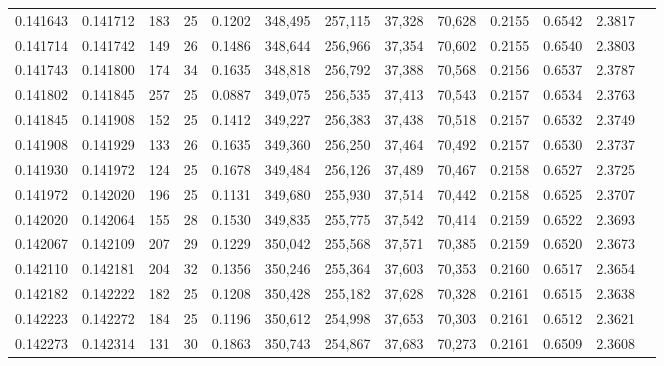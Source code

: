\begin{tabular}{rrrrrrrrrrrrr}
0.141643 & 0.141712 & 183 &  25 &                                     0.1202 & 348,495 & 257,115 &  37,328 &  70,628 & 0.2155 & 0.6542 & 2.3817 \\
0.141714 & 0.141742 & 149 &  26 &                                     0.1486 & 348,644 & 256,966 &  37,354 &  70,602 & 0.2155 & 0.6540 & 2.3803 \\
0.141743 & 0.141800 & 174 &  34 &                                     0.1635 & 348,818 & 256,792 &  37,388 &  70,568 & 0.2156 & 0.6537 & 2.3787 \\
0.141802 & 0.141845 & 257 &  25 &                                     0.0887 & 349,075 & 256,535 &  37,413 &  70,543 & 0.2157 & 0.6534 & 2.3763 \\
0.141845 & 0.141908 & 152 &  25 &                                     0.1412 & 349,227 & 256,383 &  37,438 &  70,518 & 0.2157 & 0.6532 & 2.3749 \\
0.141908 & 0.141929 & 133 &  26 &                                     0.1635 & 349,360 & 256,250 &  37,464 &  70,492 & 0.2157 & 0.6530 & 2.3737 \\
0.141930 & 0.141972 & 124 &  25 &                                     0.1678 & 349,484 & 256,126 &  37,489 &  70,467 & 0.2158 & 0.6527 & 2.3725 \\
0.141972 & 0.142020 & 196 &  25 &                                     0.1131 & 349,680 & 255,930 &  37,514 &  70,442 & 0.2158 & 0.6525 & 2.3707 \\
0.142020 & 0.142064 & 155 &  28 &                                     0.1530 & 349,835 & 255,775 &  37,542 &  70,414 & 0.2159 & 0.6522 & 2.3693 \\
0.142067 & 0.142109 & 207 &  29 &                                     0.1229 & 350,042 & 255,568 &  37,571 &  70,385 & 0.2159 & 0.6520 & 2.3673 \\
0.142110 & 0.142181 & 204 &  32 &                                     0.1356 & 350,246 & 255,364 &  37,603 &  70,353 & 0.2160 & 0.6517 & 2.3654 \\
0.142182 & 0.142222 & 182 &  25 &                                     0.1208 & 350,428 & 255,182 &  37,628 &  70,328 & 0.2161 & 0.6515 & 2.3638 \\
0.142223 & 0.142272 & 184 &  25 &                                     0.1196 & 350,612 & 254,998 &  37,653 &  70,303 & 0.2161 & 0.6512 & 2.3621 \\
0.142273 & 0.142314 & 131 &  30 &                                     0.1863 & 350,743 & 254,867 &  37,683 &  70,273 & 0.2161 & 0.6509 & 2.3608 \\

\end{tabular}
